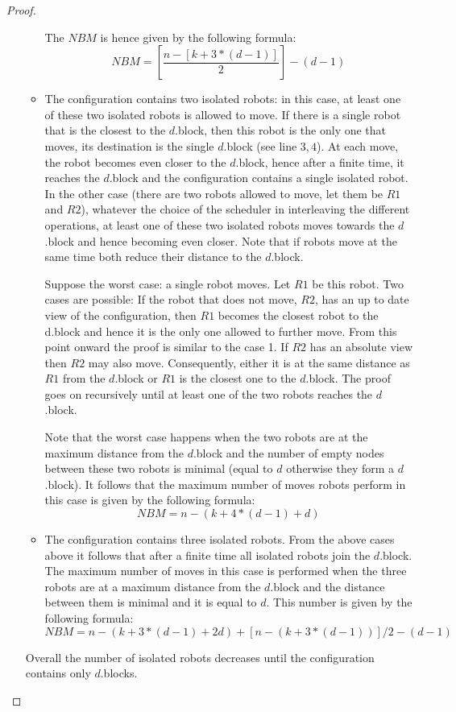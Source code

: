 \documentclass[12pt]{llncs}
\begin{document}
\begin{proof}
\begin{enumerate}
\begin{itemize}
{The $NBM$ is hence given by the following formula: \begin{equation}
    NBM=[\frac {n-[k+3*(d-1)]}{2}]-(d-1)
  \label{max1}
 \end{equation}
}


\item{The configuration contains two isolated robots: in this case, at least one of these two isolated robots is allowed to move. If there is a single robot that is the closest to the $d$.block, then this robot is the only one that moves, its destination is the single $d$.block (see line $3,4$). At each move, the robot becomes even closer to the $d$.block, hence after a finite time, it reaches the $d$.block and the configuration contains a single isolated robot. In the other case (there are two robots allowed to move, let them be $R1$ and $R2$), whatever the choice of the scheduler in interleaving the different operations, at least one of these two isolated robots moves towards the $d$.block and hence becoming even closer. Note that if robots move at the same time both reduce their distance to the $d$.block. 

Suppose the worst case: a single robot moves. Let $R1$ be this robot. Two cases are possible: If the robot that does not move, $R2$, has an up to date  view of the configuration, then $R1$ becomes the closest robot to the d.block and hence it is the only one allowed to further move. From this point onward the proof is similar to the case 1. If $R2$ has an absolute view then $R2$ may also move. Consequently, either it is at the same distance as $R1$ from the $d$.block or $R1$ is the closest one to the $d$.block. The proof goes on recursively until at least one of the two robots reaches the $d$.block. 


Note that the worst case happens when the two robots are at the maximum distance from the $d$.block and the number of empty nodes between these two robots is minimal (equal to $d$ otherwise they form a $d$.block). It follows that the maximum number of moves robots perform in this case  is given by the following formula: \begin{equation}
   NBM= n-(k+4*(d-1)+d)
  \label{max2}
 \end{equation}
}
\item{The configuration contains three isolated robots. From the above cases above it follows that after a finite time all isolated robots join the $d$.block. The maximum number of moves in this case is performed when the three robots are at a maximum distance from the $d$.block and the distance between them is minimal and it is equal to $d$. This number is given by the following formula: 
\begin{equation}
    NBM= n-(k+3*(d-1)+2d)+[n-(k+3*(d-1))]/2-(d-1)
   \label{max3}
 \end{equation}
}
\end{itemize}
Overall the number of isolated robots decreases until the configuration contains only $d$.blocks.


\end{enumerate}
\end{proof}
\end{document}
